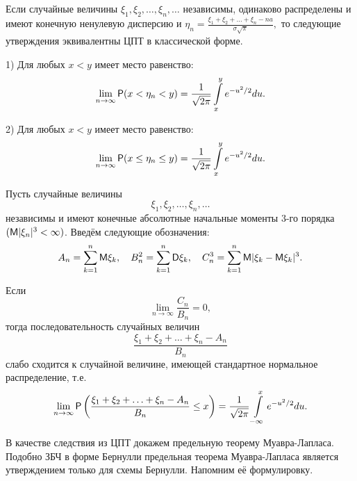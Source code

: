 \begin{consq}
\label{consq:26.4}
Если случайные величины $\xi_1 , \xi_2 , \ldots , \xi_n , \ldots$ независимы, одинаково распределены и имеют конечную ненулевую дисперсию и
$\eta_n =\frac{\xi_1+\xi_2+\ldots+\xi_n-na}{\sigma\sqrt{\pi}},$
то следующие утверждения эквивалентны ЦПТ в классической форме.

1) Для любых $x < y$ имеет место равенство:
$$
\lim\limits_{n\to\infty} \P(x<\eta_n<y)=
\frac{1}{\sqrt{2\pi}}\int\limits_{x}^y e^{-u^2/2} du.
$$

2) Для любых $x < y$ имеет место равенство:
$$
\lim\limits_{n\to\infty} \P(x \leq \eta_n \leq y)=
\frac{1}{\sqrt{2\pi}}\int\limits_x^y e^{-u^2/2} du.
$$

\end{consq}

\begin{theorem}
\label{th:26.5}
Пусть случайные величины $$\xi_1 , \xi_2 , \ldots , \xi_n , \ldots$$ независимы и имеют конечные абсолютные начальные моменты 3-го порядка $(\M|\xi_n|^3 < \infty)$. Введём следующие обозначения:
$$
A_n=\sum\limits_{k=1}^n \M\xi_k,
\quad
B_n^2=\sum\limits_{k=1}^n \D\xi_k,
\quad
C_n^3=\sum\limits_{k=1}^n \M|\xi_k-\M\xi_k|^3.
$$

Если
$$
\lim\limits_{n\to\infty}\frac{C_n}{B_n}=0,
$$
тогда последовательность случайных величин
$$
\frac{\xi_1+\xi_2+\ldots+\xi_n-A_n}{B_n}
$$
слабо сходится к случайной величине, имеющей стандартное нормальное
распределение, т.е.
$$
\lim\limits_{n\to\infty} \P\left(\frac{\xi_1+\xi_2+\ldots+\xi_n-A_n}{B_n} \leq x\right)=
\frac{1}{\sqrt{2\pi}}\int\limits_{-\infty}^x e^{-u^2/2} du.
$$
\end{theorem}

В качестве следствия из ЦПТ докажем предельную теорему Муавра-Лапласа. Подобно ЗБЧ в форме Бернулли предельная теорема Муавра-Лапласа является утверждением только для схемы Бернулли. Напомним её формулировку.

